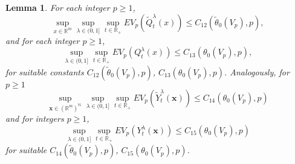\documentclass[a4paper,draft]{article}
\newtheorem{lemma}[theorem]{Lemma}
\begin{document}
\begin{lemma}\label{moments} For each integer $p\geq 1$,
$$
\sup_{x\in\mathbb{R}^m}\sup_{\lambda\in (0,1]}\sup_{t\in\mathbb{R}_+}EV_p(\tilde{Q}^{\lambda}_t(x))
\leq C_{12}(\tilde{\theta}_0(V_p),p),
$$
and for each integer $p\geq 1$,
$$
\sup_{\lambda\in (0,1]}\sup_{t\in\mathbb{R}_+}EV_p({Q}^{\lambda}_t({x}))
\leq C_{13}(\theta_0(V_p),p),
$$
for suitable constants $C_{12}(\tilde{\theta}_0(V_p),p)$, $C_{13}(\theta_0(V_p),p)$. 
Analogously, for $p\geq 1$
$$
\sup_{\mathbf{x}\in(\mathbb{R}^m)^{\mathbb{N}}}\sup_{\lambda\in (0,1]}\sup_{t\in\mathbb{R}_+}EV_p(\tilde{Y}^{\lambda}_t(\mathbf{x}))
\leq C_{14}({\theta}_0(V_p),p)
$$
and for integers $p\geq 1$,
$$
\sup_{\lambda\in (0,1]}\sup_{t\in\mathbb{R}_+}EV_p({Y}^{\lambda}_t(\mathbf{x}))
\leq C_{15}(\theta_0(V_p),p)
$$
for suitable $C_{14}(\tilde{\theta}_0(V_p),p)$, $C_{15}(\theta_0(V_p),p)$.
\end{lemma}
\end{document}

